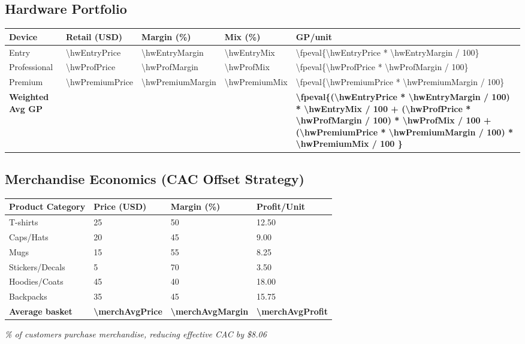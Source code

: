 \documentclass[11pt]{article}
\newcommand{\numfpeval}[1]{\num{\fpeval{#1}}}
\begin{document}
\subsection{Hardware Portfolio}
\begin{table}[H]
\centering
\begin{tabularx}{\linewidth}{l Y Y Y Y}
\toprule
Device & Retail (USD) & Margin (\%)\cite{industrybenchmark2024} & Mix (\%) & GP/unit \\\midrule
Entry        & \num{\hwEntryPrice}  & \num{\hwEntryMargin} & \num{\hwEntryMix} & \numfpeval{\hwEntryPrice * \hwEntryMargin / 100} \\
Professional & \num{\hwProfPrice} & \num{\hwProfMargin} & \num{\hwProfMix} & \numfpeval{\hwProfPrice * \hwProfMargin / 100} \\
Premium      & \num{\hwPremiumPrice} & \num{\hwPremiumMargin} & \num{\hwPremiumMix} & \numfpeval{\hwPremiumPrice * \hwPremiumMargin / 100} \\\midrule
\textbf{Weighted Avg GP} &  &  &  & \textbf{\numfpeval{(\hwEntryPrice * \hwEntryMargin / 100) * \hwEntryMix / 100 + (\hwProfPrice * \hwProfMargin / 100) * \hwProfMix / 100 + (\hwPremiumPrice * \hwPremiumMargin / 100) * \hwPremiumMix / 100 }} \\
\bottomrule
\end{tabularx}
\end{table}

\subsection{Merchandise Economics (CAC Offset Strategy)}
\begin{table}[H]
\centering
\begin{tabularx}{\linewidth}{l Y Y Y}
\toprule
Product Category & Price (USD) & Margin (\%)\cite{printful2023} & Profit/Unit \\\midrule
T-shirts & 25 & 50 & 12.50 \\
Caps/Hats & 20 & 45 & 9.00 \\
Mugs & 15 & 55 & 8.25 \\
Stickers/Decals & 5 & 70 & 3.50 \\
Hoodies/Coats & 45 & 40 & 18.00 \\
Backpacks & 35 & 45 & 15.75 \\\midrule
\textbf{Average basket} & \textbf{\num{\merchAvgPrice}} & \textbf{\num{\merchAvgMargin}} & \textbf{\num[round-precision=2]{\merchAvgProfit}} \\
\bottomrule
\end{tabularx}
\end{table}
\textit{\merchAttachRate\% of customers purchase merchandise, reducing effective CAC by \$8.06}\cite{shopify2024}
\end{document}
